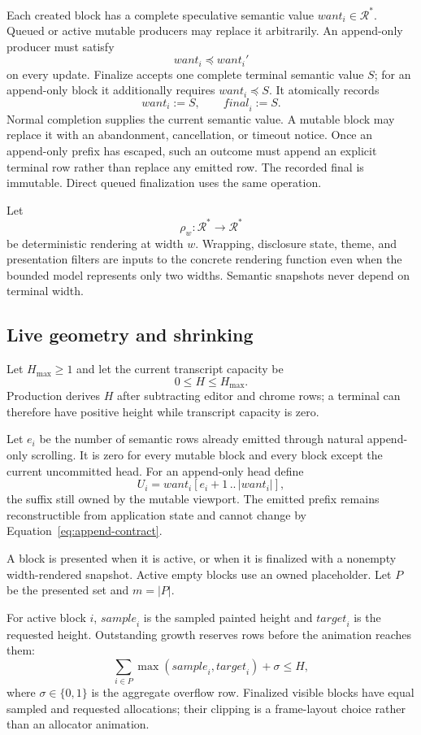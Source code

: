 \documentclass[11pt]{article}
\theoremstyle{definition}
\newcommand{\Rows}{\mathcal{R}}
\newcommand{\seq}[1]{#1^{*}}
\newcommand{\len}[1]{\lvert #1\rvert}
\newcommand{\prefixof}{\preceq}
\newcommand{\Want}{\mathit{want}}
\newcommand{\Final}{\mathit{final}}
\newcommand{\alloc}{\mathit{sample}}
\newcommand{\target}{\mathit{target}}
\begin{document}
Each created block has a complete speculative semantic value
$\Want_i\in\seq{\Rows}$.  Queued or active mutable producers may replace it
arbitrarily.  An append-only producer must satisfy
\begin{equation}
  \Want_i\prefixof\Want_i'
  \label{eq:append-contract}
\end{equation}
on every update.  Finalize accepts one complete terminal semantic value $S$;
for an append-only block it additionally requires $\Want_i\prefixof S$.
It atomically records
\[
  \Want_i:=S,\qquad \Final_i:=S.
\]
Normal completion supplies the current semantic value.  A mutable block may
replace it with an abandonment, cancellation, or timeout notice.  Once an
append-only prefix has escaped, such an outcome must append an explicit terminal
row rather than replace any emitted row.  The recorded final is immutable.  Direct queued finalization uses the same
operation.

Let
\[
  \rho_w:\seq{\Rows}\longrightarrow\seq{\Rows}
\]
be deterministic rendering at width $w$.  Wrapping, disclosure state, theme,
and presentation filters are inputs to the concrete rendering function even
when the bounded model represents only two widths.  Semantic snapshots never
depend on terminal width.

\subsection{Live geometry and shrinking}

Let $H_{\max}\geq1$ and let the current transcript capacity be
\[
  0\leq H\leq H_{\max}.
\]
Production derives $H$ after subtracting editor and chrome rows; a terminal can
therefore have positive height while transcript capacity is zero.

Let $e_i$ be the number of semantic rows already emitted through natural
append-only scrolling.  It is zero for every mutable block and every block
except the current uncommitted head.  For an append-only head define
\[
  U_i=\Want_i[e_i+1\,..\,\len{\Want_i}],
\]
the suffix still owned by the mutable viewport.  The emitted prefix remains
reconstructible from application state and cannot change by
Equation~\eqref{eq:append-contract}.

A block is presented when it is active, or when it is finalized with a
nonempty width-rendered snapshot.  Active empty blocks use an owned placeholder.
Let $P$ be the presented set and $m=\lvert P\rvert$.

For active block $i$, $\alloc_i$ is the sampled painted height and
$\target_i$ is the requested height.  Outstanding growth reserves rows before
the animation reaches them:
\begin{equation}
  \sum_{i\in P}\max(\alloc_i,\target_i)+\sigma\leq H,
  \label{eq:reservation}
\end{equation}
where $\sigma\in\{0,1\}$ is the aggregate overflow row.  Finalized visible
blocks have equal sampled and requested allocations; their clipping is a
frame-layout choice rather than an allocator animation.
\end{document}
